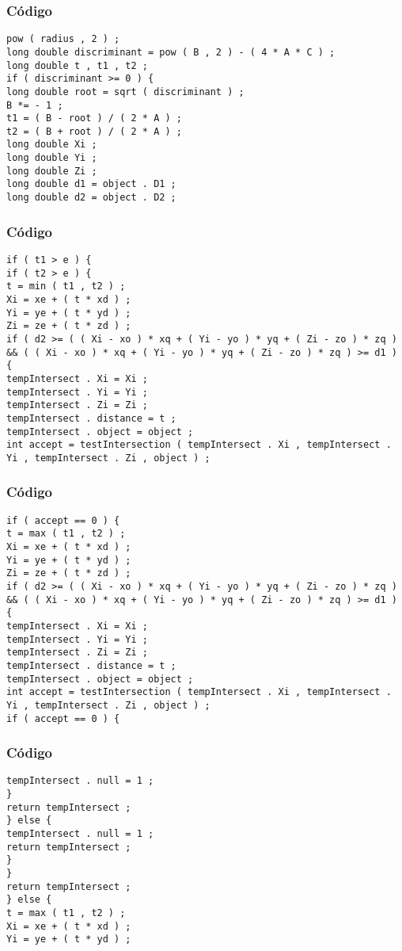 \documentclass{beamer}
\begin{document}
\begin{frame}[fragile]
\frametitle{C\'odigo}
\begin{verbatim}
pow ( radius , 2 ) ; 
long double discriminant = pow ( B , 2 ) - ( 4 * A * C ) ; 
long double t , t1 , t2 ; 
if ( discriminant >= 0 ) { 
long double root = sqrt ( discriminant ) ; 
B *= - 1 ; 
t1 = ( B - root ) / ( 2 * A ) ; 
t2 = ( B + root ) / ( 2 * A ) ; 
long double Xi ; 
long double Yi ; 
long double Zi ; 
long double d1 = object . D1 ; 
long double d2 = object . D2 ; 
\end{verbatim}
\end{frame}
\begin{frame}[fragile]
\frametitle{C\'odigo}
\begin{verbatim}
if ( t1 > e ) { 
if ( t2 > e ) { 
t = min ( t1 , t2 ) ; 
Xi = xe + ( t * xd ) ; 
Yi = ye + ( t * yd ) ; 
Zi = ze + ( t * zd ) ; 
if ( d2 >= ( ( Xi - xo ) * xq + ( Yi - yo ) * yq + ( Zi - zo ) * zq ) && ( ( Xi - xo ) * xq + ( Yi - yo ) * yq + ( Zi - zo ) * zq ) >= d1 ) { 
tempIntersect . Xi = Xi ; 
tempIntersect . Yi = Yi ; 
tempIntersect . Zi = Zi ; 
tempIntersect . distance = t ; 
tempIntersect . object = object ; 
int accept = testIntersection ( tempIntersect . Xi , tempIntersect . Yi , tempIntersect . Zi , object ) ; 
\end{verbatim}
\end{frame}
\begin{frame}[fragile]
\frametitle{C\'odigo}
\begin{verbatim}
if ( accept == 0 ) { 
t = max ( t1 , t2 ) ; 
Xi = xe + ( t * xd ) ; 
Yi = ye + ( t * yd ) ; 
Zi = ze + ( t * zd ) ; 
if ( d2 >= ( ( Xi - xo ) * xq + ( Yi - yo ) * yq + ( Zi - zo ) * zq ) && ( ( Xi - xo ) * xq + ( Yi - yo ) * yq + ( Zi - zo ) * zq ) >= d1 ) { 
tempIntersect . Xi = Xi ; 
tempIntersect . Yi = Yi ; 
tempIntersect . Zi = Zi ; 
tempIntersect . distance = t ; 
tempIntersect . object = object ; 
int accept = testIntersection ( tempIntersect . Xi , tempIntersect . Yi , tempIntersect . Zi , object ) ; 
if ( accept == 0 ) { 
\end{verbatim}
\end{frame}
\begin{frame}[fragile]
\frametitle{C\'odigo}
\begin{verbatim}
tempIntersect . null = 1 ; 
} 
return tempIntersect ; 
} else { 
tempIntersect . null = 1 ; 
return tempIntersect ; 
} 
} 
return tempIntersect ; 
} else { 
t = max ( t1 , t2 ) ; 
Xi = xe + ( t * xd ) ; 
Yi = ye + ( t * yd ) ; 
\end{verbatim}
\end{frame}
\end{document}
